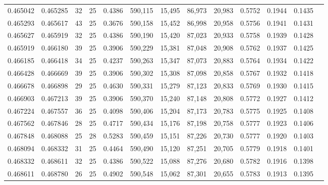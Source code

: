 \begin{tabular}{rrrrrrrrrrrrr}
0.465042 & 0.465285 &    32 &  25 &                                     0.4386 & 590,115 &  15,495 &  86,973 &  20,983 & 0.5752 & 0.1944 & 0.1435 \\
0.465293 & 0.465617 &    43 &  25 &                                     0.3676 & 590,158 &  15,452 &  86,998 &  20,958 & 0.5756 & 0.1941 & 0.1431 \\
0.465627 & 0.465919 &    32 &  25 &                                     0.4386 & 590,190 &  15,420 &  87,023 &  20,933 & 0.5758 & 0.1939 & 0.1428 \\
0.465919 & 0.466180 &    39 &  25 &                                     0.3906 & 590,229 &  15,381 &  87,048 &  20,908 & 0.5762 & 0.1937 & 0.1425 \\
0.466185 & 0.466418 &    34 &  25 &                                     0.4237 & 590,263 &  15,347 &  87,073 &  20,883 & 0.5764 & 0.1934 & 0.1422 \\
0.466428 & 0.466669 &    39 &  25 &                                     0.3906 & 590,302 &  15,308 &  87,098 &  20,858 & 0.5767 & 0.1932 & 0.1418 \\
0.466678 & 0.466898 &    29 &  25 &                                     0.4630 & 590,331 &  15,279 &  87,123 &  20,833 & 0.5769 & 0.1930 & 0.1415 \\
0.466903 & 0.467213 &    39 &  25 &                                     0.3906 & 590,370 &  15,240 &  87,148 &  20,808 & 0.5772 & 0.1927 & 0.1412 \\
0.467224 & 0.467557 &    36 &  25 &                                     0.4098 & 590,406 &  15,204 &  87,173 &  20,783 & 0.5775 & 0.1925 & 0.1408 \\
0.467562 & 0.467846 &    28 &  25 &                                     0.4717 & 590,434 &  15,176 &  87,198 &  20,758 & 0.5777 & 0.1923 & 0.1406 \\
0.467848 & 0.468088 &    25 &  28 &                                     0.5283 & 590,459 &  15,151 &  87,226 &  20,730 & 0.5777 & 0.1920 & 0.1403 \\
0.468094 & 0.468332 &    31 &  25 &                                     0.4464 & 590,490 &  15,120 &  87,251 &  20,705 & 0.5779 & 0.1918 & 0.1401 \\
0.468332 & 0.468611 &    32 &  25 &                                     0.4386 & 590,522 &  15,088 &  87,276 &  20,680 & 0.5782 & 0.1916 & 0.1398 \\
0.468611 & 0.468780 &    26 &  25 &                                     0.4902 & 590,548 &  15,062 &  87,301 &  20,655 & 0.5783 & 0.1913 & 0.1395 \\

\end{tabular}
